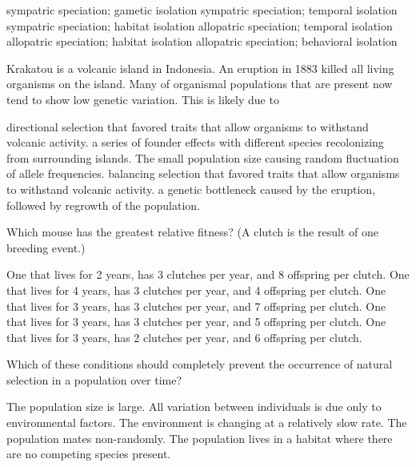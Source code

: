 \begin{choices}
\choice sympatric speciation; gametic isolation
\choice sympatric speciation; temporal isolation
\correctchoice sympatric speciation; habitat isolation
\choice allopatric speciation; temporal isolation
\choice allopatric speciation; habitat isolation
\choice allopatric speciation; behavioral isolation
\end{choices}

\newpage

\question
Krakatou is a volcanic island in Indonesia.  An eruption in 1883 killed all living organisms on the island.  Many of organismal populations that are present now tend to show low genetic variation.  This is likely due to

\begin{choices}
\choice directional selection that favored traits that allow organisms to withstand volcanic activity. 
\correctchoice a series of founder effects with different species recolonizing from surrounding islands. 
\choice The small population size causing random fluctuation of allele frequencies. 
\choice balancing selection that favored traits that allow organisms to withstand volcanic activity. 
\choice a genetic bottleneck caused by the eruption, followed by regrowth of the population. 
\end{choices}

\question
Which mouse has the greatest relative fitness? (A clutch is the result of one breeding event.)

\begin{choices}
\choice One that lives for 2 years, has 3 clutches per year, and 8 offspring per clutch. 
\choice One that lives for 4 years, has 3 clutches per year, and 4 offspring per clutch.
\correctchoice One that lives for 3 years, has 3 clutches per year, and 7 offspring per clutch. 
\choice One that lives for 3 years, has 3 clutches per year, and 5 offspring per clutch.
\choice One that lives for 3 years, has 2 clutches per year, and 6 offspring per clutch. 
\end{choices}

\question
Which of these conditions should completely prevent the occurrence of natural selection in a population over time?

\begin{choices}
\choice The population size is large. 
\correctchoice All variation between individuals is due only to environmental factors. 
\choice The environment is changing at a relatively slow rate. 
\choice The population mates non-randomly.
\choice The population lives in a habitat where there are no competing species present. 
\end{choices}


